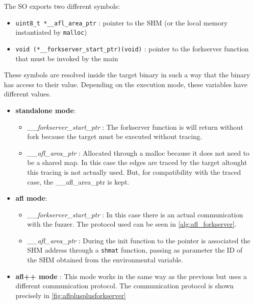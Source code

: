 The \gls{SO} exports two different symbols:
\begin{itemize}
    \item \texttt{uint8\_t *\_\_afl\_area\_ptr} : pointer to the \gls{SHM} (or the local memory instantiated by 
        \texttt{malloc})
    \item \texttt{void (*\_\_forkserver\_start\_ptr)(void)} : pointer to the forkserver function that 
        must be invoked by the main
\end{itemize}
These symbols are resolved inside the target binary in such a way that the binary has access to their value.
Depending on the execution mode, these variables have different values.
\begin{itemize}
    \item \textbf{standalone mode}:\begin{itemize}
        \item \textit{\_\_forkserver\_start\_ptr} : The forkserver function is will return without fork because 
            the target must be executed without tracing. 
        \item \textit{\_\_afl\_area\_ptr} : Allocated through a malloc because it does not need to be a shared map. 
            In this case the edges are traced by the target altought this tracing is not actually used.
            But, for compatibility with the traced case, the \_\_afl\_area\_ptr is kept.
    \end{itemize}
    \item \textbf{afl mode}:\begin{itemize}
        \item \textit{\_\_forkserver\_start\_ptr} : In this case there is an actual communication with the fuzzer. 
            The protocol used can be seen in \cref{alg:afl_forkserver}.
            
        \item \textit{\_\_afl\_area\_ptr} : During the init function to the pointer is associated the \gls{SHM} address 
            through a \texttt{shmat} function, passing as parameter the ID of the \gls{SHM} obtained from 
            the environmental variable.
    \end{itemize}
    \item \textbf{afl++ mode} : This mode works in the same way as the previous but uses a different communication protocol.
        The communication protocol is shown precisely in \cref{fig:aflplusplusforkserver}
        
\end{itemize}

